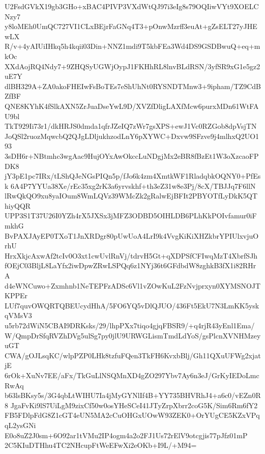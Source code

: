 U2FsdGVkX19gb3GHo+xBAC4PIVP3VXdWtQJ97i3eIg8s79OQIiwVYt9XOELCNzy7
y8loMEh0UmQC727VI1CLxBEjrFaGNq4T3+pOnwMzrff3euAt+gZsELT27yJHEwLX
R/v+4yAIUiIHkq5h4kqii03Din+NNZ1mdi9T5kbFEa3Wd4DS9GSDBwuQ+eq+mkOc
XXdAojRQ4Ndy7+9ZHQSyUGWjOypJ1FKHhRL8lnvBLdRSN/3yfSR9xG1e5gz2uE7Y
dlBH329A+ZA0akoFHEIwFsBoTEs7eShUhNt0RYSNDTMnw3+9ipham/TZ9CdBZfBF
QNE8KYhK4fSlkAXN5ZrJuaDseYwL9D/XVZfDligLAXfMcw6purxMDn61WtFAU9bl
TkT929Ii73r1/dkHRJS0dmda1qfrJZeIQ7zWr7gsXPS+ewJ1Vc0RZGob8dpVsjTN
JoQSl2ruozMqwcbQ2QJgLDljukhzodLnY6pXYWC+Dxvw9SFzve9j4mlhxQ2UO193
3sDH6r+NBtmhc3wgAac9HujOYxAwOkccLuNDgjMx2eBR8fBzEt1W3oXzcaoFPDK8
jY3pE1pc7IRx/tLShQJeNGsPIQn5p/fJo6k4zm4XmtkWF1RladqbkOQNY0+PfEsk
6A4P7YYUa38Xe/rEc35xg2rK3a6yrvskhf+th3eZ31w8e3Pj/8cX/TBJJq7F6llN
lRwQkQO9xu8yaIOum8WmLQVz39WMcZk2gRalwEjBFIt2PBYOTfLyDkK5QThiyQQR
UPP3S1T37U26I0YZh4rX5JXSx3jMFZ3ODBD5OIHLDB6PLhKkPOIvfamur0iFmkhG
BvPAXJAyEP0TXoT1JnXRDgr80pUwUoA4LrI9k4VvgKiKiXHZkbrYPIUlxvjuOrhU
HrxXkjcAxwAf2tcIv0O3xt1cwUvlRnVj/tdrvH5Gt+qXDPSfCFIwqMzT4XbrfSJh
fOEjC03BljL8LaYfx2iwDpwZRwLSPQq6z1NYj36t6GFdbdW8zghkB3fX1i82RHrA
d4eWNCuwo+Zxmhnb1NeTEPFzADSc6Vl1vZOwKuL2FzNvjprxyn0XYMSNOJTKPPEr
LUf7quvOWQRTQBEUcydHhA/5FO6YQ5vDlQJUO/436Ft5EkU7N3LmKK5yskqVMsV3
u5rb72dWiN5CBAI9DRKsks/29/lhpPXx7tiqo4gjqFBSR9/+q4rjR43yEnl1Ema/
W/QmpDrSfqRVZhDVg5ulSg7py0jlU9URWGLismTmdLdYoS/gsPlcnXVNHMzeyuGT
CWA/gOJLsqKC/wlpPZP0LHk8tzfuFQen3TkFH6KvxbBlj/Gh11QXuUFWg2xjatjE
6rOk+XuNv7EE/aFx/TkGuLlNSQMnXD4gZO297Ybv7Ay6n3eJ/GrKyIEDoLmcRwAq
b63lsBKsy5s/3G4qbLtWIHU7Ia4jMyGYNlIf4B+YY735BHVRhJ4+a6c0/vEZn0R8
JgaFvKi9lS7UiLgM9zixCf50w0osYHeSCeI41JTyZrpXbrr2coG5K/Sim6Rm6fY2
FB5FDlpFdG8Z1cGT4eUN5MA2cCuOHGxUOwW93ZEK0+OrYUgCE5KZxVPqqL2ysGNi
E0o8uZ2J0sm+6O92ar1tVMu2IP4ogm4a2o2FJ1Us72rElV9otcgjis77pJfz01mP
2C5KIuDTHhu4TC2NHcupFtWeEFwXi2eOKb+I9L/+M94=
